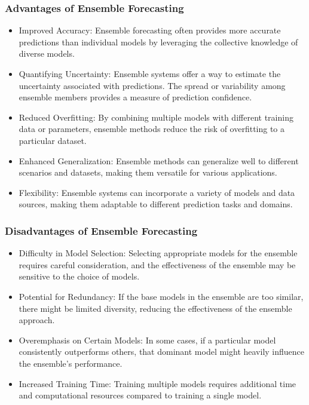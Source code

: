 \documentclass[../paper.tex]{subfiles}
\begin{document}
\subsubsection{Advantages of Ensemble Forecasting}
\begin{itemize}
    \item Improved Accuracy:
    Ensemble forecasting often provides more accurate predictions than individual models
    by leveraging the collective knowledge of diverse models.

    \item Quantifying Uncertainty: Ensemble systems offer a way to estimate the uncertainty associated with predictions.
    The spread or variability among ensemble members provides a measure of prediction confidence.

    \item Reduced Overfitting:
    By combining multiple models with different training data or parameters,
    ensemble methods reduce the risk of overfitting to a particular dataset.

    \item Enhanced Generalization: Ensemble methods can generalize well to different scenarios and datasets,
    making them versatile for various applications.

    \item Flexibility: Ensemble systems can incorporate a variety of models and data sources,
    making them adaptable to different prediction tasks and domains.
\end{itemize}

\subsubsection{Disadvantages of Ensemble Forecasting}
\begin{itemize}
    \item Difficulty in Model Selection:
    Selecting appropriate models for the ensemble requires careful consideration,
    and the effectiveness of the ensemble may be sensitive to the choice of models.

    \item Potential for Redundancy: If the base models in the ensemble are too similar,
    there might be limited diversity, reducing the effectiveness of the ensemble approach.

    \item Overemphasis on Certain Models:
    In some cases, if a particular model consistently outperforms others,
    that dominant model might heavily influence the ensemble's performance.

    \item Increased Training Time:
    Training multiple models requires additional time and computational resources compared to training a single model.
\end{itemize}
\end{document}
